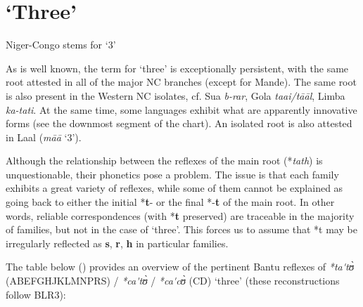 \clearpage
\section{‘Three’} 
\begin{table}
\caption{\label{tab:4:5}Niger-Congo stems for `3'}
\kppyramid
{}


 
\end{table}

As is well known, the term for ‘three’ is exceptionally persistent, with the same root attested in all of the major NC branches (except for Mande). The same root is also present in the Western NC isolates, cf. Sua \textit{b-rar}, Gola \textit{taai/t{\={a}}{\={a}}l}, Limba \textit{ka-tati}. At the same time, some languages exhibit what are apparently innovative forms (see the downmost segment of the chart). An isolated root is also attested in Laal (\textit{m{\={a}}{\={a}}} ‘3’).

Although the relationship between the reflexes of the main root (*\textit{tath}) is unquestionable, their phonetics pose a problem. The issue is that each family exhibits a great variety of reflexes, while some of them cannot be explained as going back to either the initial *\textbf{t}- or the final *-\textbf{t} of the main root. In other words, reliable correspondences (with *\textbf{t} preserved) are traceable in the majority of families, but not in the case of ‘three’. This forces us to assume that *t may be irregularly reflected as \textbf{s}, \textbf{r}, \textbf{h} in particular families.

The table below () provides an overview of the pertinent Bantu reflexes of \textit{*ta\'{}t{\`{ʊ}}} (ABEFGHJKLMNPRS) / \textit{*ca\'{}t{\`{ʊ}}} / \textit{*ca\'{}c{\`{ʊ}}}   (CD) ‘three’ (these reconstructions follow BLR3):

